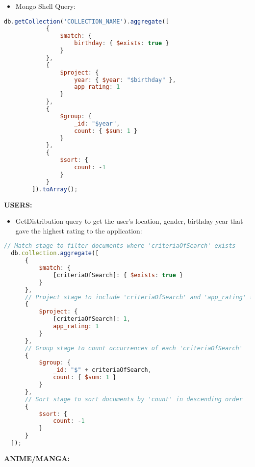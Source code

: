    \begin{itemize}
        \item Mongo Shell Query:
    \end{itemize}
    \begin{lstlisting}[language=JavaScript]
        db.getCollection('COLLECTION_NAME').aggregate([
            { 
                $match: { 
                    birthday: { $exists: true }  
                } 
            },
            { 
                $project: { 
                    year: { $year: "$birthday" },  
                    app_rating: 1 
                } 
            },
            { 
                $group: { 
                    _id: "$year", 
                    count: { $sum: 1 } 
                } 
            },
            { 
                $sort: { 
                    count: -1 
                } 
            }
        ]).toArray();        
    \end{lstlisting}



\newpage

\textbf{USERS:}
\begin{itemize}
  \item GetDistribution query to get the user's location, gender, birthday year that gave the highest rating to the application:
  
\end{itemize}
\begin{lstlisting}[language=JavaScript, caption=GetDistribution]
  // Match stage to filter documents where 'criteriaOfSearch' exists
  db.collection.aggregate([
      {
          $match: {
              [criteriaOfSearch]: { $exists: true }
          }
      },
      // Project stage to include 'criteriaOfSearch' and 'app_rating' fields
      {
          $project: {
              [criteriaOfSearch]: 1,
              app_rating: 1
          }
      },
      // Group stage to count occurrences of each 'criteriaOfSearch'
      {
          $group: {
              _id: "$" + criteriaOfSearch,
              count: { $sum: 1 }
          }
      },
      // Sort stage to sort documents by 'count' in descending order
      {
          $sort: {
              count: -1
          }
      }
  ]);
  \end{lstlisting}
  


\textbf{ANIME/MANGA:}

